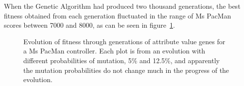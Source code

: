 \documentclass[conference]{IEEEtran}
\begin{document}
When the Genetic Algorithm had produced two thousand generations, the best fitness obtained from each generation fluctuated in the range of Ms PacMan scores between 7000 and 8000, as can be seen in figure~\ref{geneticEvolution}.


\begin{figure}
\centering
{}\qquad
{}
\caption{Evolution of fitness through generations of attribute value genes for a Ms PacMan controller.  Each plot is from an evolution with different probabilities of mutation, 5\% and 12.5\%, and apparently the mutation probabilities do not change much in the progress of the evolution.}
\label{geneticEvolution}
\end{figure}
\end{document}
